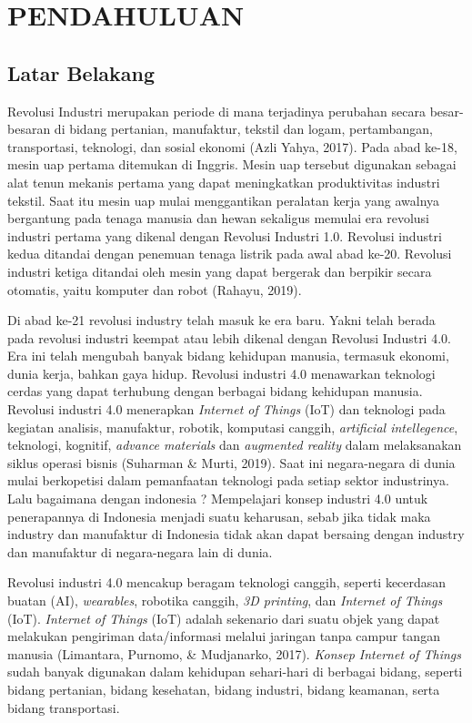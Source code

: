 \chapter{PENDAHULUAN}

\section{Latar Belakang}
Revolusi Industri merupakan periode di mana terjadinya perubahan secara besar-besaran di bidang pertanian, manufaktur, tekstil dan logam, pertambangan, transportasi, teknologi, dan sosial ekonomi (Azli Yahya, 2017). Pada abad ke-18, mesin uap pertama ditemukan di Inggris. Mesin uap tersebut digunakan sebagai alat tenun mekanis pertama yang dapat meningkatkan produktivitas industri tekstil. Saat itu mesin uap mulai menggantikan peralatan kerja yang awalnya bergantung pada tenaga manusia dan hewan sekaligus memulai era revolusi industri pertama yang dikenal dengan Revolusi Industri 1.0. Revolusi industri kedua ditandai dengan penemuan tenaga listrik pada awal abad ke-20. Revolusi industri ketiga ditandai oleh mesin yang dapat bergerak dan berpikir secara otomatis, yaitu komputer dan robot (Rahayu, 2019). 

Di abad ke-21 revolusi industry telah masuk ke era baru. Yakni telah berada pada revolusi industri keempat atau lebih dikenal dengan Revolusi Industri 4.0. Era ini telah mengubah banyak bidang kehidupan manusia, termasuk ekonomi, dunia kerja, bahkan gaya hidup. Revolusi industri 4.0 menawarkan teknologi cerdas yang dapat terhubung dengan berbagai bidang kehidupan manusia. Revolusi industri 4.0 menerapkan \textit{Internet of Things} (IoT) dan teknologi pada kegiatan analisis, manufaktur, robotik, komputasi canggih, \textit{artificial intellegence}, teknologi, kognitif, \textit{advance materials} dan \textit{augmented reality} dalam melaksanakan siklus operasi bisnis (Suharman \& Murti, 2019). Saat ini negara-negara di dunia mulai berkopetisi dalam pemanfaatan teknologi pada setiap sektor industrinya. Lalu bagaimana dengan indonesia ? Mempelajari konsep industri 4.0 untuk penerapannya di Indonesia menjadi suatu keharusan, sebab jika tidak maka industry dan manufaktur di Indonesia tidak akan dapat bersaing dengan industry dan manufaktur di negara-negara lain di dunia.

Revolusi industri 4.0 mencakup beragam teknologi canggih, seperti kecerdasan buatan (AI), \textit{wearables}, robotika canggih, \textit{3D printing}, dan \textit{Internet of Things} (IoT). \textit{Internet of Things} (IoT) adalah sekenario dari suatu objek yang dapat melakukan pengiriman data/informasi melalui jaringan tanpa campur tangan manusia (Limantara, Purnomo, \& Mudjanarko, 2017). \textit{Konsep Internet of Things} sudah banyak digunakan dalam kehidupan sehari-hari di berbagai bidang, seperti bidang pertanian, bidang kesehatan, bidang industri, bidang keamanan, serta bidang transportasi.

